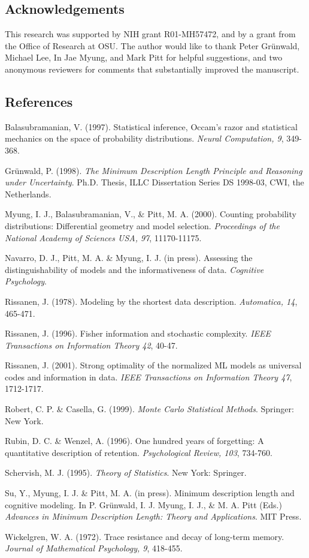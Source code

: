 \documentclass[doc,floatsintext]{apa6}
\begin{document}
\subsection*{Acknowledgements}

This research was supported by NIH grant R01-MH57472, and by a grant from the Office of Research at OSU. The author would like to thank Peter Gr\"{u}nwald, Michael Lee, In Jae Myung, and Mark Pitt for helpful suggestions, and two anonymous reviewers for comments that substantially improved the manuscript.


\subsection*{References}


\begin{list}
{}{\setlength{\leftmargin}{10pt}\setlength{\itemindent}{-10pt}\setlength{\parsep}{0pt}}
\item Balasubramanian, V. (1997). Statistical inference, Occam's razor and statistical mechanics on the space of probability distributions. {\it Neural Computation, 9}, 349-368.
\item Gr\"{u}nwald, P. (1998). {\it The Minimum Description Length Principle and Reasoning under Uncertainty}. Ph.D. Thesis, ILLC Dissertation Series DS 1998-03, CWI, the Netherlands.
\item Myung, I. J., Balasubramanian, V., \& Pitt, M. A. (2000). Counting probability distributions: Differential geometry and model selection. {\it Proceedings of the National Academy of Sciences USA, 97}, 11170-11175.
\item Navarro, D. J., Pitt, M. A. \& Myung, I. J. (in press). Assessing the distinguishability of models and the informativeness of data. {\it Cognitive Psychology}.
\item Rissanen, J. (1978). Modeling by the shortest data description. {\it Automatica, 14}, 465-471.
\item Rissanen, J. (1996). Fisher information and stochastic complexity. {\it IEEE Transactions on Information Theory 42}, 40-47.
\item Rissanen, J. (2001). Strong optimality of the normalized ML models as universal codes and information in data. {\it IEEE Transactions on Information Theory 47}, 1712-1717.
\item Robert, C. P. \& Casella, G. (1999). {\it Monte Carlo Statistical Methods}. Springer: New York.
\item Rubin, D. C. \& Wenzel, A. (1996). One hundred years of forgetting: A quantitative description of retention. {\it Psychological Review, 103}, 734-760.
\item Schervish, M. J. (1995). {\it Theory of Statistics}. New York: Springer.
\item Su, Y., Myung, I. J. \& Pitt, M. A. (in press). Minimum description length and cognitive modeling. In P. Gr\"{u}nwald, I. J. Myung, I. J., \& M. A. Pitt (Eds.) {\it Advances in Minimum Description Length: Theory and Applications}. MIT Press.
\item Wickelgren, W. A. (1972). Trace resistance and decay of long-term memory. {\it Journal of Mathematical Psychology, 9}, 418-455.
\end{list}


\end{document}
